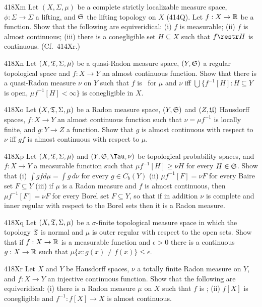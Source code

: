 {\spheader 418Xm Let $(X,\Sigma,\mu)$ be a complete strictly localizable
measure space, $\phi:\Sigma\to\Sigma$ a lifting, and $\frak S$ the
lifting topology on $X$ (414Q).   Let $f:X\to\Bbb R$ be a function.
Show that the
following are equiveridical:  (i) $f$ is measurable;  (ii) $f$ is almost
continuous;  (iii) there is a conegligible set $H\subseteq X$ such that
$f\restr H$ is continuous.   (Cf.\ 414Xr.)

\spheader 418Xn Let $(X,\frak T,\Sigma,\mu)$ be a quasi-Radon measure
space, $(Y,\frak S)$ a regular topological space and $f:X\to Y$ an
almost continuous function.   Show that there is a quasi-Radon measure
$\nu$ on $Y$ such that $f$ is \imp\ for $\mu$ and $\nu$ iff
$\bigcup\{f^{-1}[H]:H\subseteq Y$ is open, $\mu f^{-1}[H]<\infty\}$ is
conegligible in $X$.

\spheader 418Xo Let $(X,\frak T,\Sigma,\mu)$ be a Radon measure space,
$(Y,\frak S)$ and $(Z,\frak U)$ Hausdorff spaces, $f:X\to Y$ an almost
continuous function such that $\nu=\mu f^{-1}$ is locally finite, and
$g:Y\to Z$ a function.   Show that $g$ is almost continuous with respect
to $\nu$ iff $gf$ is almost continuous with respect to $\mu$.

\spheader 418Xp Let $(X,\frak T,\Sigma,\mu)$ and $(Y,\frak S,\Tau,\nu)$
be topological probability spaces, and $f:X\to Y$ a measurable function
such that $\mu f^{-1}[H]\ge\nu H$ for every $H\in\frak S$.
Show that (i) $\int gfd\mu=\int g\,d\nu$ for every $g\in C_b(Y)$ (ii)
$\mu f^{-1}[F]=\nu F$ for every Baire set $F\subseteq Y$ (iii) if $\mu$
is a Radon measure and $f$ is almost continuous, then
$\mu f^{-1}[F]=\nu F$ for every Borel set $F\subseteq Y$, so that if in
addition $\nu$ is complete and inner regular with respect to the Borel
sets then it is a Radon measure.

\spheader 418Xq Let $(X,\frak T,\Sigma,\mu)$ be a $\sigma$-finite
topological measure space in which the topology $\frak T$ is normal and
$\mu$ is outer regular with respect to the open sets.   Show that if
$f:X\to\Bbb R$ is a measurable function and $\epsilon>0$ there is a
continuous $g:X\to\Bbb R$ such that $\mu\{x:g(x)\ne f(x)\}\le\epsilon$.

\spheader 418Xr Let $X$ and $Y$ be Hausdorff spaces, $\nu$ a totally
finite Radon measure on $Y$, and $f:X\to Y$ an injective continuous
function.   Show that the following are equiveridical:  (i) there is a
Radon measure $\mu$ on $X$ such that $f$ is \imp;
(ii) $f[X]$ is conegligible and $f^{-1}:f[X]\to X$ is almost continuous.

}
